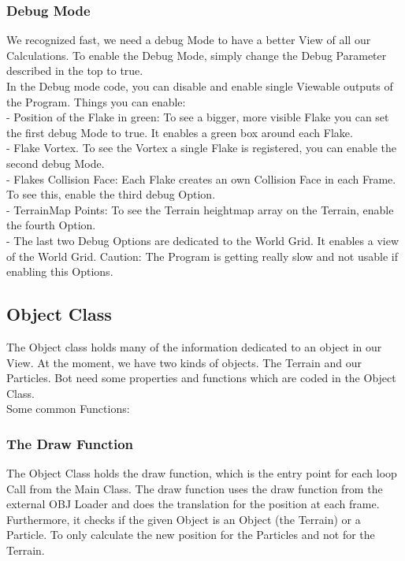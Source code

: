 \documentclass{sig-alternate-05-2015}
\begin{document}
\subsubsection{Debug Mode}
We recognized fast, we need a debug Mode to have a better View of all our Calculations. To enable the Debug Mode, simply change the Debug Parameter described in the top to true. \\
In the Debug mode code, you can disable and enable single Viewable outputs of the Program. Things you can enable:\\
-	Position of the Flake in green: To see a bigger, more visible Flake you can set the first debug Mode to true. It enables a green box around each Flake.\\
-	Flake Vortex. To see the Vortex a single Flake is registered, you can enable the second debug Mode.\\
-	Flakes Collision Face: Each Flake creates an own Collision Face in each Frame. To see this, enable the third debug Option. \\
-	TerrainMap Points: To see the Terrain heightmap array on the Terrain, enable the fourth Option.\\
-	The last two Debug Options are dedicated to the World Grid. It enables a view of the World Grid. Caution: The Program is getting really slow and not usable if enabling this Options.\\

\subsection{Object Class}
The Object class holds many of the information dedicated to an object in our View. At the moment, we have two kinds of objects. The Terrain and our Particles. Bot need some properties and functions which are coded in the Object Class. \\
Some common Functions:\\
\subsubsection{The Draw Function}
The Object Class holds the draw function, which is the entry point for each loop Call from the Main Class. The draw function uses the draw function from the external OBJ Loader and does the translation for the position at each frame. Furthermore, it checks if the given Object is an Object (the Terrain) or a Particle. To only calculate the new position for the Particles and not for the Terrain.  \\
\end{document}
